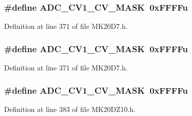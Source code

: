 \subsubsection[{\texorpdfstring{A\+D\+C\+\_\+\+C\+V1\+\_\+\+C\+V\+\_\+\+M\+A\+SK}{ADC_CV1_CV_MASK}}]{\setlength{\rightskip}{0pt plus 5cm}\#define A\+D\+C\+\_\+\+C\+V1\+\_\+\+C\+V\+\_\+\+M\+A\+SK~0x\+F\+F\+F\+Fu}\hypertarget{group___a_d_c___register___masks_gad67c3b5f385cd9b26be8257134e1e3cf}{}\label{group___a_d_c___register___masks_gad67c3b5f385cd9b26be8257134e1e3cf}


Definition at line 371 of file M\+K20\+D7.\+h.

\subsubsection[{\texorpdfstring{A\+D\+C\+\_\+\+C\+V1\+\_\+\+C\+V\+\_\+\+M\+A\+SK}{ADC_CV1_CV_MASK}}]{\setlength{\rightskip}{0pt plus 5cm}\#define A\+D\+C\+\_\+\+C\+V1\+\_\+\+C\+V\+\_\+\+M\+A\+SK~0x\+F\+F\+F\+Fu}\hypertarget{group___a_d_c___register___masks_gad67c3b5f385cd9b26be8257134e1e3cf}{}\label{group___a_d_c___register___masks_gad67c3b5f385cd9b26be8257134e1e3cf}


Definition at line 371 of file M\+K20\+D7.\+h.

\subsubsection[{\texorpdfstring{A\+D\+C\+\_\+\+C\+V1\+\_\+\+C\+V\+\_\+\+M\+A\+SK}{ADC_CV1_CV_MASK}}]{\setlength{\rightskip}{0pt plus 5cm}\#define A\+D\+C\+\_\+\+C\+V1\+\_\+\+C\+V\+\_\+\+M\+A\+SK~0x\+F\+F\+F\+Fu}\hypertarget{group___a_d_c___register___masks_gad67c3b5f385cd9b26be8257134e1e3cf}{}\label{group___a_d_c___register___masks_gad67c3b5f385cd9b26be8257134e1e3cf}


Definition at line 383 of file M\+K20\+D\+Z10.\+h.

